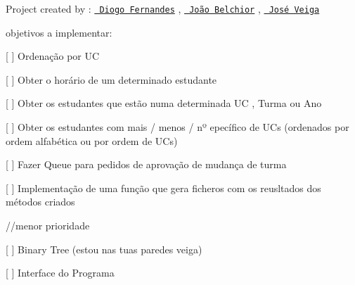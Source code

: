 Project created by \+: \href{https://github.com/diogotvf7}{\texttt{ Diogo Fernandes}} , \href{https://github.com/b3lchior}{\texttt{ João Belchior}} , \href{https://github.com/kikoveiga}{\texttt{ José Veiga}}

objetivos a implementar\+:
\begin{DoxyItemize}
\item \mbox{[} \mbox{]} Ordenação por UC
\item \mbox{[} \mbox{]} Obter o horário de um determinado estudante
\item \mbox{[} \mbox{]} Obter os estudantes que estão numa determinada UC , Turma ou Ano
\item \mbox{[} \mbox{]} Obter os estudantes com mais / menos / nº epecífico de UCs (ordenados por ordem alfabética ou por ordem de UCs)
\item \mbox{[} \mbox{]} Fazer Queue para pedidos de aprovação de mudança de turma ~\newline

\item \mbox{[} \mbox{]} Implementação de uma função que gera ficheros com os reusltados dos métodos criados
\end{DoxyItemize}

//menor prioridade
\begin{DoxyItemize}
\item \mbox{[} \mbox{]} Binary Tree (estou nas tuas paredes veiga)
\item \mbox{[} \mbox{]} Interface do Programa
\end{DoxyItemize}

 